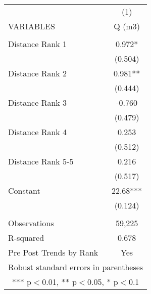 \begin{tabular}{lc} \hline
 & (1) \\
VARIABLES & Q (m3) \\ \hline
 &  \\
Distance Rank 1 & 0.972* \\
 & (0.504) \\
Distance Rank 2 & 0.981** \\
 & (0.444) \\
Distance Rank 3 & -0.760 \\
 & (0.479) \\
Distance Rank 4 & 0.253 \\
 & (0.512) \\
Distance Rank 5-5 & 0.216 \\
 & (0.517) \\
Constant & 22.68*** \\
 & (0.124) \\
 &  \\
Observations & 59,225 \\
R-squared & 0.678 \\
 Pre Post Trends by Rank & Yes \\ \hline
\multicolumn{2}{c}{ Robust standard errors in parentheses} \\
\multicolumn{2}{c}{ *** p$<$0.01, ** p$<$0.05, * p$<$0.1} \\
\end{tabular}
